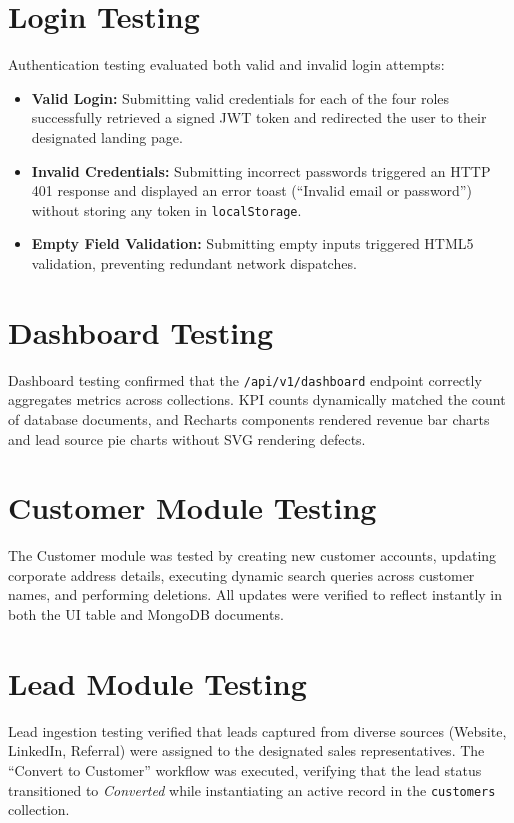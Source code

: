\section{Login Testing}
Authentication testing evaluated both valid and invalid login attempts:
\begin{itemize}
    \item \textbf{Valid Login:} Submitting valid credentials for each of the four roles successfully retrieved a signed JWT token and redirected the user to their designated landing page.
    \item \textbf{Invalid Credentials:} Submitting incorrect passwords triggered an HTTP 401 response and displayed an error toast (``Invalid email or password'') without storing any token in \texttt{localStorage}.
    \item \textbf{Empty Field Validation:} Submitting empty inputs triggered HTML5 validation, preventing redundant network dispatches.
\end{itemize}

\section{Dashboard Testing}
Dashboard testing confirmed that the \texttt{/api/v1/dashboard} endpoint correctly aggregates metrics across collections. KPI counts dynamically matched the count of database documents, and Recharts components rendered revenue bar charts and lead source pie charts without SVG rendering defects.

\section{Customer Module Testing}
The Customer module was tested by creating new customer accounts, updating corporate address details, executing dynamic search queries across customer names, and performing deletions. All updates were verified to reflect instantly in both the UI table and MongoDB documents.

\section{Lead Module Testing}
Lead ingestion testing verified that leads captured from diverse sources (Website, LinkedIn, Referral) were assigned to the designated sales representatives. The ``Convert to Customer'' workflow was executed, verifying that the lead status transitioned to \textit{Converted} while instantiating an active record in the \texttt{customers} collection.

